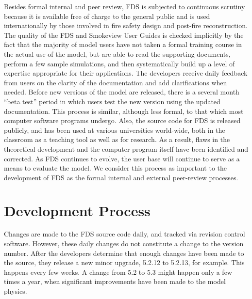 \documentclass[11pt]{book}
\begin{document}
Besides formal internal and peer review, FDS is subjected to continuous scrutiny because
it is available free of charge to the general public and is used
internationally by those involved in fire safety design and post-fire reconstruction.
The quality of the FDS and Smokeview User Guides is checked implicitly by the fact that the
majority of model users have not taken a formal training course in the actual use of the model, but
are able to read the supporting documents, perform a few sample simulations, and then systematically build
up a level of expertise appropriate for their applications. The developers receive daily feedback from
users on the clarity of the documentation and add clarifications
when needed. Before new versions of the model are released, there is a several month ``beta test'' period
in which users test the new version using the updated documentation. This process is similar,
although less formal, to that which most computer software programs undergo.
Also, the source code for FDS is released publicly, and has been used at
various universities world-wide, both in the classroom as a teaching tool as well as for research.
As a result, flaws in the theoretical development and the computer program itself
have been identified and corrected. As FDS continues to evolve, the user base will continue to
serve as a means to evaluate the model. We consider this process as important to the development of FDS as the formal
internal and external peer-review processes.


\clearpage
\section{Development Process}

Changes are made to the FDS source code daily, and tracked via revision control software. However, these daily changes do not constitute a change to
the version number. After the developers determine that enough changes have been made to the source, they release a new minor upgrade, 5.2.12 to
5.2.13, for example. This happens every few weeks. A change from 5.2 to 5.3 might happen only a few times a year, when significant improvements have
been made to the model physics.
\end{document}
